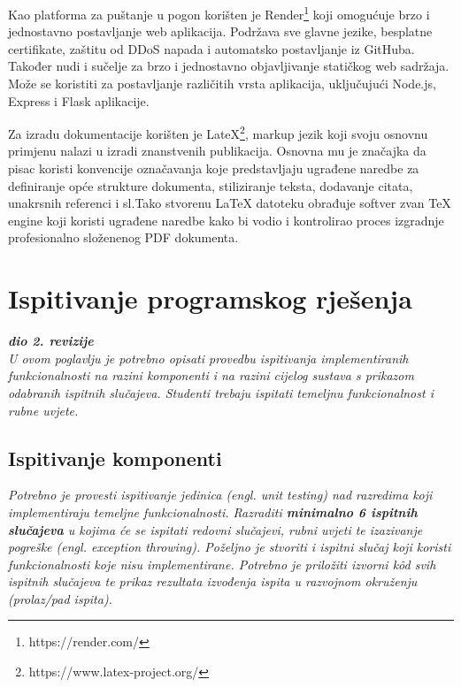              Kao platforma za puštanje u pogon korišten je Render\footnote{https://render.com/} koji omogućuje brzo i jednostavno postavljanje web aplikacija. Podržava sve glavne jezike, besplatne certifikate, zaštitu od DDoS napada i automatsko postavljanje iz GitHuba. Također nudi i sučelje za brzo i jednostavno objavljivanje statičkog web sadržaja. Može se koristiti za postavljanje različitih vrsta aplikacija, uključujući Node.js, Express i Flask aplikacije.		 
			 
			 Za izradu dokumentacije korišten je LateX\footnote{https://www.latex-project.org/}, markup jezik koji svoju osnovnu primjenu nalazi u izradi znanstvenih publikacija. Osnovna mu je značajka da pisac koristi konvencije označavanja koje predstavljaju ugrađene naredbe za definiranje opće strukture dokumenta, stiliziranje teksta, dodavanje citata, unakrsnih referenci i sl.Tako stvorenu LaTeX datoteku obrađuje softver zvan TeX engine koji koristi ugrađene naredbe kako bi vodio i kontrolirao proces izgradnje profesionalno složenenog PDF dokumenta.
			\eject 
		
	
		\section{Ispitivanje programskog rješenja}
			
			\textbf{\textit{dio 2. revizije}}\\
			
			 \textit{U ovom poglavlju je potrebno opisati provedbu ispitivanja implementiranih funkcionalnosti na razini komponenti i na razini cijelog sustava s prikazom odabranih ispitnih slučajeva. Studenti trebaju ispitati temeljnu funkcionalnost i rubne uvjete.}
	
			
			\subsection{Ispitivanje komponenti}
			\textit{Potrebno je provesti ispitivanje jedinica (engl. unit testing) nad razredima koji implementiraju temeljne funkcionalnosti. Razraditi \textbf{minimalno 6 ispitnih slučajeva} u kojima će se ispitati redovni slučajevi, rubni uvjeti te izazivanje pogreške (engl. exception throwing). Poželjno je stvoriti i ispitni slučaj koji koristi funkcionalnosti koje nisu implementirane. Potrebno je priložiti izvorni kôd svih ispitnih slučajeva te prikaz rezultata izvođenja ispita u razvojnom okruženju (prolaz/pad ispita). }
			
